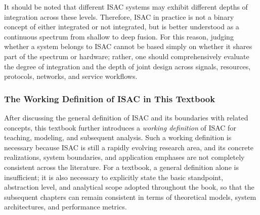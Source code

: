It should be noted that different ISAC systems may exhibit different depths of integration across these levels. Therefore, ISAC in practice is not a binary concept of either integrated or not integrated, but is better understood as a continuous spectrum from shallow to deep fusion. For this reason, judging whether a system belongs to ISAC cannot be based simply on whether it shares part of the spectrum or hardware; rather, one should comprehensively evaluate the degree of integration and the depth of joint design across signals, resources, protocols, networks, and service workflows.

\subsubsection{The Working Definition of ISAC in This Textbook}
\label{subsubsec:ch1-working-definition}

After discussing the general definition of ISAC and its boundaries with related concepts, this textbook further introduces a \emph{working definition} of ISAC for teaching, modeling, and subsequent analysis. Such a working definition is necessary because ISAC is still a rapidly evolving research area, and its concrete realizations, system boundaries, and application emphases are not completely consistent across the literature. For a textbook, a general definition alone is insufficient; it is also necessary to explicitly state the basic standpoint, abstraction level, and analytical scope adopted throughout the book, so that the subsequent chapters can remain consistent in terms of theoretical models, system architectures, and performance metrics.

